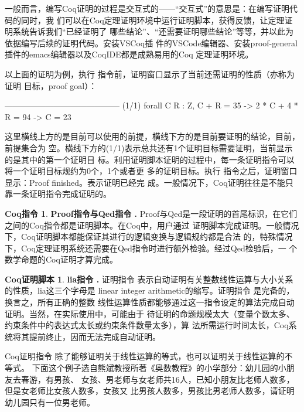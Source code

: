 \documentclass{article}[margin=1pt]
\theoremstyle{definition}
\newtheorem{CoqCmd}{Coq指令}
\newtheorem{CoqLtac}{Coq证明脚本}
\begin{document}
 一般而言，编写Coq证明的过程是交互式的——“交互式”的意思是：在编写证明代码的同时，我
    们可以在Coq定理证明环境中运行证明脚本，获得反馈，让定理证明系统告诉我们“已经证明了
    哪些结论”、“还需要证明哪些结论”等等，并以此为依据编写后续的证明代码。安装VSCoq插
    件的VSCode编辑器、安装proof-general插件的emacs编辑器以及CoqIDE都是成熟易用的Coq
    定理证明环境。
    
    以上面的证明为例，执行  指令前，证明窗口显示了当前还需证明的性质（亦称为证明
    目标，proof goal）：
\begin{mytext4}
  ------------------------------------------
  (1/1)
  forall C R : Z,
  C + R = 35 -> 2 * C + 4 * R = 94 -> C = 23


\end{mytext4}
\noindent
 这里横线上方的是目前可以使用的前提，横线下方的是目前要证明的结论，目前，前提集合为
    空。横线下方的(1/1)表示总共还有1个证明目标需要证明，当前显示的是其中的第一个证明目
    标。利用证明脚本证明的过程中，每一条证明指令可以将一个证明目标规约为0个，1个或者更
    多的证明目标。执行  指令之后，证明窗口显示：Proof finished。表示证明已经完
    成。一般情况下，Coq证明往往是不能只靠一条证明指令完成证明的。

\begin{CoqCmd}\textbf{ Proof指令与Qed指令 . }
 Proof与Qed是一段证明的首尾标识，在它们之间的Coq指令都是证明脚本。在Coq中，用户通过
    证明脚本完成证明。一般情况下，Coq证明脚本都能保证其进行的逻辑变换与逻辑规约都是合法
    的，特殊情况下，Coq定理证明系统还需要在Qed指令时进行额外检验。经过Qed检验后，一
    个数学命题的Coq证明才算完成。

\end{CoqCmd}
\begin{CoqLtac}\textbf{ lia指令 . }
 证明指令  表示自动证明有关整数线性运算与大小关系的性质，lia这三个字母是
    linear integer arithmetic的缩写。证明指令  是完备的，换言之，所有正确的整数
    线性运算性质都能够通过这一指令设定的算法完成自动证明。当然，在实际使用中，可能由于
    待证明的命题规模太大（变量个数太多、约束条件中的表达式太长或约束条件数量太多），算
    法所需运行时间太长，Coq系统将其提前终止，因而无法完成自动证明。

\end{CoqLtac}
 Coq证明指令  除了能够证明关于线性运算的等式，也可以证明关于线性运算的不等式。
    下面这个例子选自熊斌教授所著《奥数教程》的小学部分：幼儿园的小朋友去春游，有男孩、
    女孩、男老师与女老师共16人，已知小朋友比老师人数多，但是女老师比女孩人数多，女孩又
    比男孩人数多，男孩比男老师人数多，请证明幼儿园只有一位男老师。
\end{document}
